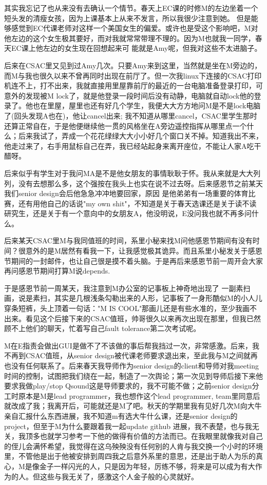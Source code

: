 \documentclass[12pt]{book}
\begin{document}
其实我忘记了也从来没有去确认一个情节。春天上EC课的时修M的左边坐着一个短头发的清瘦女孩，因为上课基本上从来不发言，所以我很少注意到她。 但是能够感觉到EC代课老师对这样一个美国女生的偏爱。或许也是受这个影响吧，M对他左边的这个女生极其要好，而对我就常常带理不理的。因为M也就我一同学，春天EC课上他左边的女生现在回想起来可 能就是Amy呢，但我对这些不太进脑子。

后来在CSAC里又见到过Amy几次。只要Amy来到这里，当然就是坐在M旁边的，而M与我也很久以来不曾再同时出现在前厅了。但一次我linux下连接的CSAC打印机连不上，打不出来，我就直接用里屋靠前厅的最近的一台电脑准备登录打印，可意外的发现被M lock了，就是他登录一段时间后没有动静，电脑就自动lock他的登录了。他也在里屋，屋里也还有好几个学生，我便大大方方地问M是不是lock电脑了(回头发现A也在)，他让cancel出来; 我不知道从哪里cancel，CSAC里学生那时还算正常自在，于是他便继续他一贯的风格坐在A旁边遥控指挥从哪里点一个什么；后来我试了，弄成一个花花绿绿大大小小好几个窗口关不掉。知道我出不来，他走过来了，右手用鼠标自己在弄，我已经站起身来离开座位，不能让人家A吃干醋呀。

后来似乎有学生对于我问MA是不是他女朋友的事情耿耿于怀。我从来就是大大列列，没有去想那么多，这个强按在我头上也实在说不过去呀。后来感恩节之前某天我们senior design会后他急急冲冲地要回家，原因 是他弟弟有一场重要的体育比赛，还有用他自己的话说"my own shit"，不知道是关于春天选课还是关于读不读研究生，还是关于有一个意向中的女朋友A，他没明说，E没问我也就不再多问什么。

后来某天CSAC里M与我同值班的时间，系里小秘来找M问他感恩节期间有没有时间？很意外的是M居然有看我一下，让我感觉极其诡异。而且系里小秘发关于感恩节期间的一封邮件，也让自己很是摸不着头脑。于是再后来感恩节前一周开会大家再问感恩节期间打算M说depends.

于是感恩节前一周某天，我注意到M办公室的记事板上神奇地出现了 一副素扫画，说是素扫，其实是几根浅条勾勒出来的人形，记事板了一身形酷似M的小人儿穿条短裤，头上顶着一句话："M IS COOL"那画儿还是有些水准的，至少我画不出来。看见这个后接下来的CSAC值班，帅哥很久以来再次出现在那里，但我已然顾不上他们的聊天，忙着写自己fault tolerance第二次考试呢。

M在E指责会做出GUI是做不了不该做的事后帮我挡过一次，非常感激。后来，我不再到CSAC值班，从senior design被代课老师要求退出来，至此我与M之间就再也没有任何联系了。后来春天我导师作为senior design的client和导师对我meeting时间的控制，试图把我们绕在一起，制造了一次舆论；第一次见到导师后接下来他要求我做play/stop Qsound这是导师要求的，我不可能不做；之前senior design分工时原本是M是lead programmer，我也想作这个lead programmer, team里同意后就改成了我；我离开后，可能就还是M了吧。秋天的学期里我有见好几次M向大牛亲自汇报什么东西进展，我不知道m有选大牛什么课，还是senior design的project，但至于M为什么要跟着我一起update github 进展，我不表楚，也与我无关，我顶多也就学习参考一下他的做得有价值的方法而已。在我眼里就像我对自己的侄儿会满怀希望，我觉得在这乌殃殃没有任何别的人肯与我交换一个小时的环境里，不管他是出于他被安排到周四我之后意外系里的意思，还是出于助人为乐的真心，M是像金子一样闪光的人，只是因为年轻，厉练不够，将来是可以成为有大作为的人。但这些与我无关了，感激这个人金子般的心灵就好。
\end{document}
